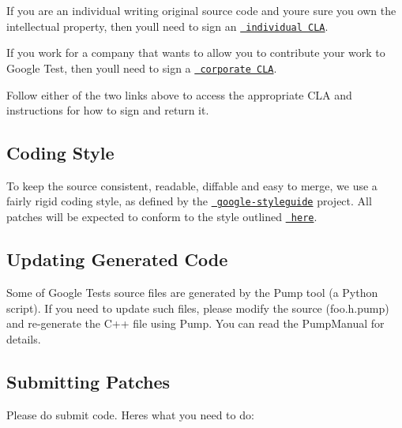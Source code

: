 \begin{DoxyItemize}
\item If you are an individual writing original source code and you\textquotesingle{}re sure you own the intellectual property, then you\textquotesingle{}ll need to sign an \href{http://code.google.com/legal/individual-cla-v1.0.html}\texttt{ individual C\+LA}.
\item If you work for a company that wants to allow you to contribute your work to Google Test, then you\textquotesingle{}ll need to sign a \href{http://code.google.com/legal/corporate-cla-v1.0.html}\texttt{ corporate C\+LA}.
\end{DoxyItemize}

Follow either of the two links above to access the appropriate C\+LA and instructions for how to sign and return it.

\subsection*{Coding Style}

To keep the source consistent, readable, diffable and easy to merge, we use a fairly rigid coding style, as defined by the \href{http://code.google.com/p/google-styleguide/}\texttt{ google-\/styleguide} project. All patches will be expected to conform to the style outlined \href{http://google-styleguide.googlecode.com/svn/trunk/cppguide.xml}\texttt{ here}.

\subsection*{Updating Generated Code}

Some of Google Test\textquotesingle{}s source files are generated by the Pump tool (a Python script). If you need to update such files, please modify the source ({\ttfamily foo.\+h.\+pump}) and re-\/generate the C++ file using Pump. You can read the Pump\+Manual for details.

\subsection*{Submitting Patches}

Please do submit code. Here\textquotesingle{}s what you need to do\+:


